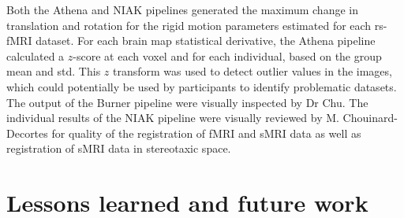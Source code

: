 \documentclass[preprint,12pt,3p]{elsarticle}
\begin{document}
Both the Athena and NIAK pipelines generated the maximum change in translation and rotation for the rigid motion parameters estimated for each rs-fMRI dataset. For each brain map statistical derivative, the Athena pipeline calculated a $z$-score at each voxel and for each individual, based on the group mean and std. This $z$ transform was used to detect outlier values in the images, which could potentially be used by participants to identify problematic datasets. The output of the Burner pipeline were visually inspected by Dr Chu. The individual results of the NIAK pipeline were visually reviewed by M. Chouinard-Decortes for quality of the registration of fMRI and sMRI data as well as registration of sMRI data in stereotaxic space.

\section{Lessons learned and future work}
\end{document}
